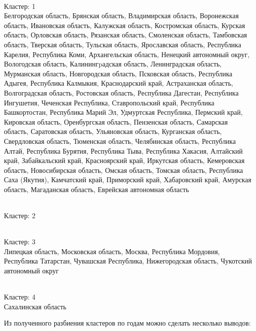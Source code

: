 \documentclass[11pt]{article}
\begin{document}
\newline \\ Кластер:  1
\\ Белгородская область, Брянская область, Владимирская область, Воронежская область, Ивановская область, Калужская область, Костромская область, Курская область, Орловская область, Рязанская область, Смоленская область, Тамбовская область, Тверская область, Тульская область, Ярославская область, Республика Карелия, Республика Коми, Архангельская область, Ненецкий автономный округ, Вологодская область, Калинингpадская область, Ленинградская область, Мурманская область, Новгородская область, Псковская область, Республика Адыгея, Республика Калмыкия, Краснодарский край, Астраханская область, Волгоградская область, Ростовская область, Республика Дагестан, Республика Ингушетия, Чеченская Республика, Ставропольский край, Республика Башкортостан, Республика Марий Эл, Удмуртская Республика, Пермский край, Кировская область, Оренбургская область, Пензенская область, Самарская область, Саратовская область, Ульяновская область, Курганская область, Свердловская область, Тюменская область, Челябинская область, Республика Алтай, Республика Бурятия, Республика Тыва, Республика Хакасия, Алтайский край, Забайкальский край, Красноярский край, Иркутская область, Кемеровская область, Новосибирская область, Омская область, Томская область, Республика Саха (Якутия), Камчатский край, Приморский край, Хабаровский край, Амурская область, Магаданская область, Еврейская автономная область

\newline \\ Кластер:  2


\newline \\ Кластер:  3
\\ Липецкая область, Московская область, Москва, Республика Мордовия, Республика Татарстан, Чувашская Республика, Нижегородская область, Чукотский автономный округ

\newline \\ Кластер:  4
\\ Сахалинская область


    Из полученного разбиения кластеров по годам можно сделать несколько
выводов:
\end{document}
